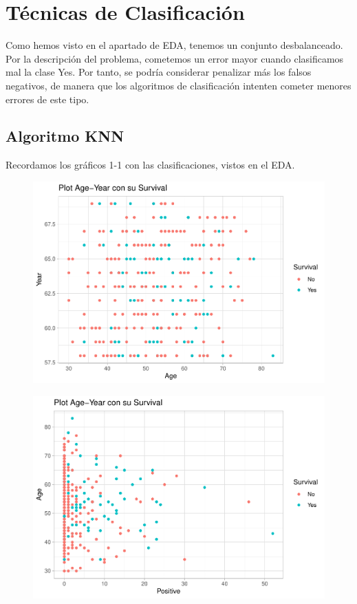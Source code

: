 \section{Técnicas de Clasificación}

Como hemos visto en el apartado de EDA, tenemos un conjunto desbalanceado. Por la descripción del problema, cometemos un error mayor cuando clasificamos mal la clase Yes. Por tanto, se podría considerar penalizar más los falsos negativos, de manera que los algoritmos de clasificación intenten cometer menores errores de este tipo. 

\subsection{Algoritmo KNN}

Recordamos los gráficos 1-1 con las clasificaciones, vistos en el EDA.

\begin{figure}[H]\center\includegraphics[width=.9\linewidth]{img/Clasificacion_files/figure-latex/unnamed-chunk-5-1}\caption{}\end{figure}

\begin{figure}[H]\center\includegraphics[width=.9\linewidth]{img/Clasificacion_files/figure-latex/unnamed-chunk-5-2}\caption{}\end{figure}

